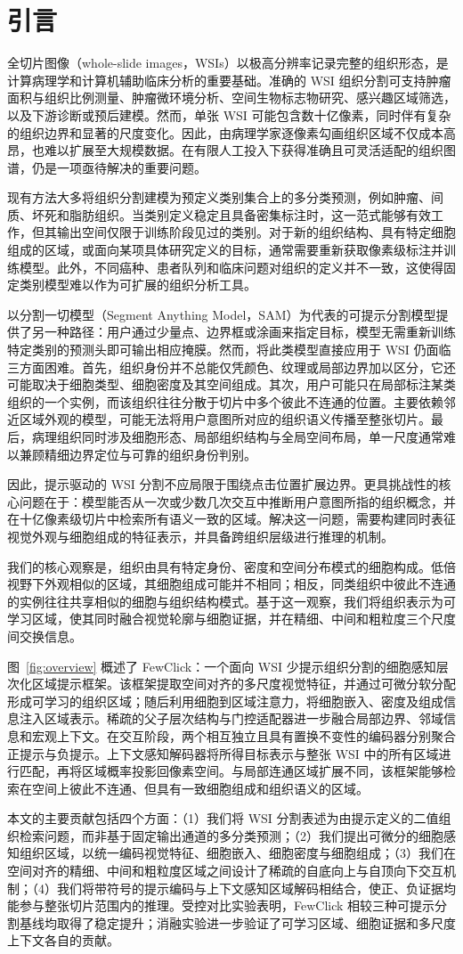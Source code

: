 \section{引言}

全切片图像（whole-slide images，WSIs）以极高分辨率记录完整的组织形态，是计算病理学和计算机辅助临床分析的重要基础。准确的 WSI 组织分割可支持肿瘤面积与组织比例测量、肿瘤微环境分析、空间生物标志物研究、感兴趣区域筛选，以及下游诊断或预后建模。然而，单张 WSI 可能包含数十亿像素，同时伴有复杂的组织边界和显著的尺度变化。因此，由病理学家逐像素勾画组织区域不仅成本高昂，也难以扩展至大规模数据。在有限人工投入下获得准确且可灵活适配的组织图谱，仍是一项亟待解决的重要问题。

现有方法大多将组织分割建模为预定义类别集合上的多分类预测，例如肿瘤、间质、坏死和脂肪组织。当类别定义稳定且具备密集标注时，这一范式能够有效工作，但其输出空间仅限于训练阶段见过的类别。对于新的组织结构、具有特定细胞组成的区域，或面向某项具体研究定义的目标，通常需要重新获取像素级标注并训练模型。此外，不同癌种、患者队列和临床问题对组织的定义并不一致，这使得固定类别模型难以作为可扩展的组织分析工具。

以分割一切模型（Segment Anything Model，SAM）为代表的可提示分割模型提供了另一种路径：用户通过少量点、边界框或涂画来指定目标，模型无需重新训练特定类别的预测头即可输出相应掩膜。然而，将此类模型直接应用于 WSI 仍面临三方面困难。首先，组织身份并不总能仅凭颜色、纹理或局部边界加以区分，它还可能取决于细胞类型、细胞密度及其空间组成。其次，用户可能只在局部标注某类组织的一个实例，而该组织往往分散于切片中多个彼此不连通的位置。主要依赖邻近区域外观的模型，可能无法将用户意图所对应的组织语义传播至整张切片。最后，病理组织同时涉及细胞形态、局部组织结构与全局空间布局，单一尺度通常难以兼顾精细边界定位与可靠的组织身份判别。

因此，提示驱动的 WSI 分割不应局限于围绕点击位置扩展边界。更具挑战性的核心问题在于：模型能否从一次或少数几次交互中推断用户意图所指的组织概念，并在十亿像素级切片中检索所有语义一致的区域。解决这一问题，需要构建同时表征视觉外观与细胞组成的特征表示，并具备跨组织层级进行推理的机制。

我们的核心观察是，组织由具有特定身份、密度和空间分布模式的细胞构成。低倍视野下外观相似的区域，其细胞组成可能并不相同；相反，同类组织中彼此不连通的实例往往共享相似的细胞与组织结构模式。基于这一观察，我们将组织表示为可学习区域，使其同时融合视觉轮廓与细胞证据，并在精细、中间和粗粒度三个尺度间交换信息。

图~\ref{fig:overview} 概述了 FewClick：一个面向 WSI 少提示组织分割的细胞感知层次化区域提示框架。该框架提取空间对齐的多尺度视觉特征，并通过可微分软分配形成可学习的组织区域；随后利用细胞到区域注意力，将细胞嵌入、密度及组成信息注入区域表示。稀疏的父子层次结构与门控适配器进一步融合局部边界、邻域信息和宏观上下文。在交互阶段，两个相互独立且具有置换不变性的编码器分别聚合正提示与负提示。上下文感知解码器将所得目标表示与整张 WSI 中的所有区域进行匹配，再将区域概率投影回像素空间。与局部连通区域扩展不同，该框架能够检索在空间上彼此不连通、但具有一致细胞组成和组织语义的区域。

本文的主要贡献包括四个方面：（1）我们将 WSI 分割表述为由提示定义的二值组织检索问题，而非基于固定输出通道的多分类预测；（2）我们提出可微分的细胞感知组织区域，以统一编码视觉特征、细胞嵌入、细胞密度与细胞组成；（3）我们在空间对齐的精细、中间和粗粒度区域之间设计了稀疏的自底向上与自顶向下交互机制；（4）我们将带符号的提示编码与上下文感知区域解码相结合，使正、负证据均能参与整张切片范围内的推理。受控对比实验表明，FewClick 相较三种可提示分割基线均取得了稳定提升；消融实验进一步验证了可学习区域、细胞证据和多尺度上下文各自的贡献。
